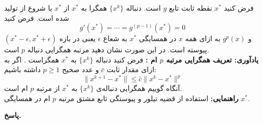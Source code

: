 
فرض کنید 
\(x^*\)
نقطه ثابت تابع 
\(g\)
 است. دنباله 
 \(\{x^k\}\)
 همگرا به 
 \(x^*\)
 از
 \(x^*\)
 با شروع از 
 تولید شده است. فرض کنید
 	\[g'(x^*) = \cdots =g^{(p-1)}(x^*) =0 \]
 	و \(g^p(x)\)
 	به ازای همه 
 	\(x\)
 	در همسایگی
 	\(x^*\)
 	به شعاع
 	\(\epsilon\)
 	یعنی در بازه
 	\((x^* -\epsilon, x^*+\epsilon)\)
 	پیوسته است. 
 در این صورت نشان دهید مرتبه همگرایی دنباله 
  \(p\)
 است.
 \\
\textbf{یادآوری: تعریف همگرایی  مرتبه 
	\(p\) ام
	:}
فرض کنید دنباله
\(\{x^k\}\)
به 
\(x^*\)
همگراست . اگر به ازای مقدار ثابت 
\(\bar{c}\)
و عدد صحیح
\(p\geq 1\)
داشته باشیم:
\[\|x^{k+1} - x^*\| \leq \bar{c}\|x^k - x^*\|^p\]
آنگاه گوییم همگرایی دنباله‌ی 
\(\{x^k\}\)
به 
\(x^*\)
از مرتبه 
\(p\)
ام است.
\\
 \textbf{راهنمایی:}   استفاده از قضیه تیلور  و پیوستگی تابع مشتق مرتبه
\(p\)
ام در همسایگی  
\(x^*\).

\begin{answer}
	
	\textbf{پاسخ.}
	
\end{answer}